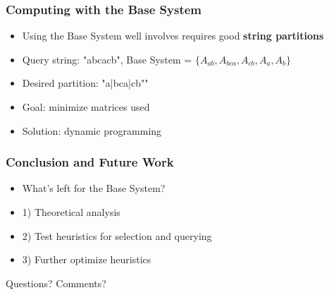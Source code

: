\documentclass{beamer}
\begin{document}

\begin{frame}
\frametitle{Computing with the Base System}
\begin{itemize}


\item Using the Base System well involves requires good \textbf{string partitions}

\item[] Query string: "abcacb", Base System = $\{A_{ab}, A_{bca}, A_{cb}, A_a, A_b \}$ 


\item[] Desired partition: "a|bca|cb""

\item Goal: minimize matrices used

\item Solution: dynamic programming

\end{itemize}
\end{frame}


\begin{frame}
\frametitle{Conclusion and Future Work}
\begin{itemize}

\item What's left for the Base System?
\item[] 1) Theoretical analysis

\item[] 2) Test heuristics for selection and querying

\item[] 3) Further optimize heuristics


\end{itemize}
\end{frame}


\begin{frame}
\Huge{\centerline{Questions? Comments?}}
\end{frame}





\end{document}
